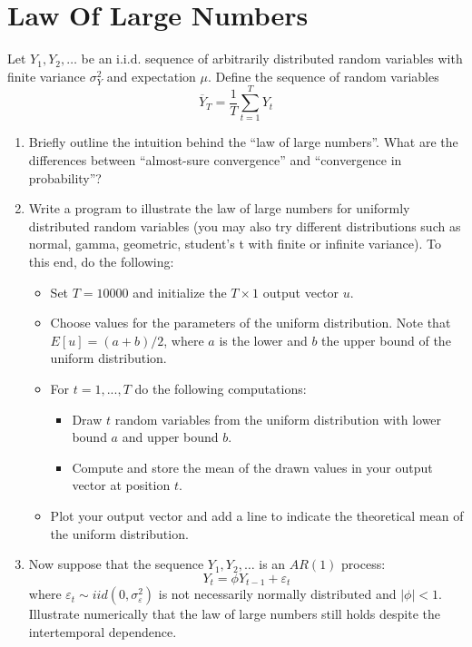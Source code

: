 \section[Law Of Large Numbers]{Law Of Large Numbers\label{ex:LawOfLargeNumbers}}
Let $Y_{1},Y_{2},\ldots $ be an i.i.d. sequence of arbitrarily distributed random variables
  with finite variance $\sigma_Y ^{2}$ and expectation $\mu$.
Define the sequence of random variables
\begin{equation*}
\overline{Y}_{T}=\frac{1}{T}\sum_{t=1}^{T}Y_{t}
\end{equation*}
\begin{enumerate}
\item Briefly outline the intuition behind the \enquote{law of large numbers}.
What are the differences between \enquote{almost-sure convergence}
  and \enquote{convergence in probability}?
\item Write a program to illustrate the law of large numbers for uniformly distributed random variables
  (you may also try different distributions such as normal, gamma, geometric, student's t with finite or infinite variance).
To this end, do the following:
\begin{itemize}
	\item Set $T=10000$ and initialize the $T \times 1$ output vector $u$.
	\item Choose values for the parameters of the uniform distribution.
	Note that $E[u] = (a+b)/2$, where $a$ is the lower and $b$ the upper bound of the uniform distribution.
	\item For $t=1,...,T$ do the following computations:
	\begin{itemize}
		\item Draw $t$ random variables from the uniform distribution with lower bound $a$ and upper bound $b$.
		\item Compute and store the mean of the drawn values in your output vector at position $t$.
	\end{itemize}
	\item Plot your output vector and add a line to indicate the theoretical mean of the uniform distribution.
\end{itemize}
\item Now suppose that the sequence $Y_{1},Y_{2},\ldots $ is an $AR(1)$ process:
$$Y_{t} =\phi Y_{t-1} +\varepsilon _{t}$$
where $\varepsilon _{t}\sim iid(0,\sigma _{\varepsilon }^{2})$ is not necessarily normally distributed and $|\phi |<1$.
Illustrate numerically that the law of large numbers still holds despite the intertemporal dependence.
\end{enumerate}


